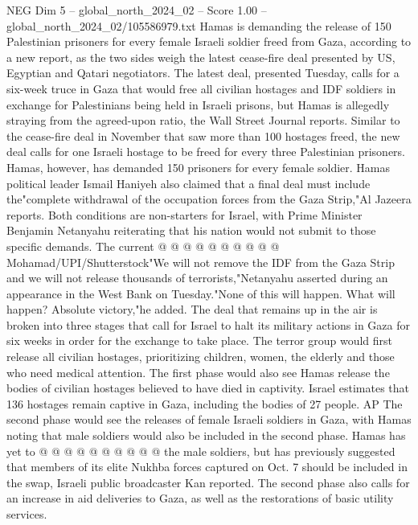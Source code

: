 \begin{textsample}{NEG Dim 5 – global\_north\_2024\_02 – Score 1.00 – global\_north\_2024\_02/105586979.txt}  \label{ex:f5_neg_215}
Hamas is demanding the release of 150 Palestinian prisoners for every female Israeli soldier freed from Gaza, according to a new report, as the two sides weigh the latest cease-fire deal presented by US, Egyptian and Qatari negotiators.
The latest deal, presented Tuesday, calls for a six-week truce in Gaza that would free all civilian hostages and IDF soldiers in exchange for Palestinians being held in Israeli prisons, but Hamas is allegedly straying from the agreed-upon ratio, the Wall Street Journal reports.
Similar to the cease-fire deal in November that saw more than 100 hostages freed, the new deal calls for one Israeli hostage to be freed for every three Palestinian prisoners.
Hamas, however, has demanded 150 prisoners for every female soldier.
Hamas political leader Ismail Haniyeh also claimed that a final deal must include the"complete withdrawal of the occupation forces from the Gaza Strip,"Al Jazeera reports.
Both conditions are non-starters for Israel, with Prime Minister Benjamin Netanyahu reiterating that his nation would not submit to those specific demands.
The current @ @ @ @ @ @ @ @ @ @ Mohamad/UPI/Shutterstock"We will not remove the IDF from the Gaza Strip and we will not release thousands of terrorists,"Netanyahu asserted during an appearance in the West Bank on Tuesday."None of this will happen.
What will happen?
Absolute victory,"he added.
The deal that remains up in the air is broken into three stages that call for Israel to halt its military actions in Gaza for six weeks in order for the exchange to take place.
The terror group would first release all civilian hostages, prioritizing children, women, the elderly and those who need medical attention.
The first phase would also see Hamas release the bodies of civilian hostages believed to have died in captivity.
Israel estimates that 136 hostages remain captive in Gaza, including the bodies of 27 people.
AP The second phase would see the releases of female Israeli soldiers in Gaza, with Hamas noting that male soldiers would also be included in the second phase.
Hamas has yet to @ @ @ @ @ @ @ @ @ @ the male soldiers, but has previously suggested that members of its elite Nukhba forces captured on Oct. 7 should be included in the swap, Israeli public broadcaster Kan reported.
The second phase also calls for an increase in aid deliveries to Gaza, as well as the restorations of basic utility services.

\end{textsample}
